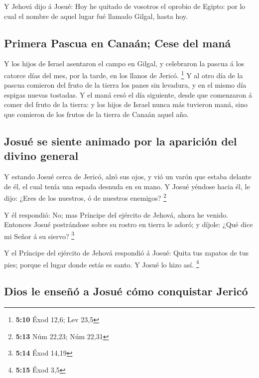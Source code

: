  Y Jehová dijo á Josué: Hoy he quitado de vosotros el
oprobio de Egipto: por lo cual el nombre de aquel lugar fué llamado
Gilgal, hasta hoy.

\hypertarget{primera-pascua-en-canauxe1n-cese-del-manuxe1}{%
\subsection{Primera Pascua en Canaán; Cese del
maná}\label{primera-pascua-en-canauxe1n-cese-del-manuxe1}}

 Y los hijos de Israel asentaron el campo en Gilgal, y
celebraron la pascua á los catorce días del mes, por la tarde, en los
llanos de Jericó. \footnote{\textbf{5:10} Éxod 12,6; Lev 23,5}
 Y al otro día de la pascua comieron del fruto de la
tierra los panes sin levadura, y en el mismo día espigas nuevas
tostadas.  Y el maná cesó el día siguiente, desde que
comenzaron á comer del fruto de la tierra: y los hijos de Israel nunca
más tuvieron maná, sino que comieron de los frutos de la tierra de
Canaán aquel año.

\hypertarget{josuuxe9-se-siente-animado-por-la-apariciuxf3n-del-divino-general}{%
\subsection{Josué se siente animado por la aparición del divino
general}\label{josuuxe9-se-siente-animado-por-la-apariciuxf3n-del-divino-general}}

 Y estando Josué cerca de Jericó, alzó sus ojos, y vió un
varón que estaba delante de él, el cual tenía una espada desnuda en su
mano. Y Josué yéndose hacia él, le dijo: ¿Eres de los nuestros, ó de
nuestros enemigos? \footnote{\textbf{5:13} Núm 22,23; Núm 22,31}

 Y él respondió: No; mas Príncipe del ejército de Jehová,
ahora he venido. Entonces Josué postrándose sobre su rostro en tierra le
adoró; y díjole: ¿Qué dice mi Señor á su siervo? \footnote{\textbf{5:14}
  Éxod 14,19}

 Y el Príncipe del ejército de Jehová respondió á Josué:
Quita tus zapatos de tus pies; porque el lugar donde estás es santo. Y
Josué lo hizo así. \footnote{\textbf{5:15} Éxod 3,5}

\hypertarget{dios-le-enseuxf1uxf3-a-josuuxe9-cuxf3mo-conquistar-jericuxf3}{%
\subsection{Dios le enseñó a Josué cómo conquistar
Jericó}\label{dios-le-enseuxf1uxf3-a-josuuxe9-cuxf3mo-conquistar-jericuxf3}}

